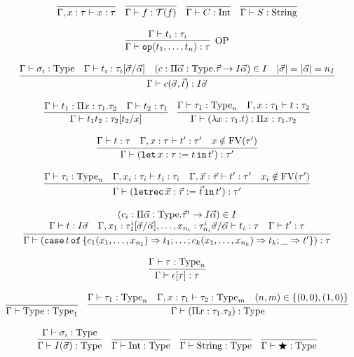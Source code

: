 \documentclass[
    9pt,            %
    techreport,        %
    affiltop,       %
]{art}
\begin{document}
\[
\begin{array}{c}
\infer{\Gamma, x : \tau \proves x : \tau}{}\quad
\infer{\Gamma \proves f : \Tc(f)}{}\quad
\infer{\Gamma \proves C : \Int}{}\quad
\infer{\Gamma \proves S : \String}{}
\\ \\
\infer[\mathrm{OP}]{\Gamma \proves \op(t_1,\ldots,t_n) : \tau}{\Gamma \proves t_i : \tau_i}
\\ \\
\infer{\Gamma \proves c(\vec{\sigma},\vec{t}) : I \vec{\sigma}}{\Gamma \proves \sigma_i : \Type & \Gamma \proves t_i : \tau_i[\vec{\sigma}/\vec{\alpha}] & (c : \Pi \vec{\alpha} : \Type . \vec{\tau} \to I \vec{\alpha}) \in I & |\vec{\sigma}| = |\vec{\alpha}| = n_I}
\\ \\
\infer{\Gamma \proves t_1 t_2 : \tau_2[t_2/x]}{\Gamma \proves t_1 : \Pi x : \tau_1 . \tau_2 & \Gamma \proves t_2 : \tau_1}\quad
\infer{\Gamma \proves (\lambda x : \tau_1 . t) : \Pi x : \tau_1 . \tau_2}{\Gamma \proves \tau_1 : \Type_n & \Gamma, x : \tau_1 \proves t : \tau_2}
\\ \\
\infer{\Gamma \proves (\slet{x : \tau := t}{t'}) : \tau'}{\Gamma \proves t : \tau & \Gamma, x : \tau \proves t' : \tau' & x \notin \FV(\tau')}
\\ \\
\infer{\Gamma \proves (\sletrec{\vec{x} : \vec{\tau} := \vec{t}}{t'}) : \tau'}{\Gamma \proves \tau_i : \Type_n & \Gamma, x_i : \tau_i \proves t_i : \tau_i & \Gamma, \vec{x} : \vec{\tau} \proves t' : \tau' & x_i \notin \FV(\tau')}
\\ \\
\infer{\Gamma \proves (\scase{t}{\{c_1(x_1,\ldots,x_{n_1}) \To t_1; \ldots; c_k(x_1,\ldots,x_{n_k}) \To t_k; \_ \To t'\}}) : \tau}{\multicolumn{3}{c}{(c_i : \Pi \vec{\alpha} : \Type . \vec{\tau}^i \to I\vec{\alpha}) \in I}\\ \Gamma \proves t : I \vec{\sigma} & \Gamma, x_1 : \tau_1^i[\vec{\sigma}/\vec{\alpha}], \ldots, x_{n_i} : \tau_{n_i}^i\vec{\sigma}/\vec{\alpha} \proves t_i : \tau & \Gamma \proves t' : \tau}
\\ \\
\infer{\Gamma \proves \epsilon[\tau] : \tau}{\Gamma \proves \tau : \Type_n}
\\ \\
\infer{\Gamma \proves \Type : \Type_1}{}\quad
\infer{\Gamma \proves (\Pi x : \tau_1 . \tau_2) : \Type}{\Gamma \proves \tau_1 : \Type_n & \Gamma, x : \tau_1 \proves \tau_2 : \Type_m & (n,m) \in \{(0,0), (1,0)\}}
\\ \\
\infer{\Gamma \proves I(\vec{\sigma}) : \Type}{\Gamma \proves \sigma_i : \Type}\quad
\infer{\Gamma \proves \Int : \Type}{}\quad
\infer{\Gamma \proves \String : \Type}{}\quad
\infer{\Gamma \proves \Dynamic : \Type}{}
\end{array}
\]
\end{document}
